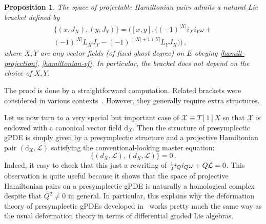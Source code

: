 \documentclass[a4paper,12pt]{article}
\numberwithin{equation}{section} %
\newtheorem{prop}[thm]{Proposition}
\newcommand{\dx}{\mathrm{d}_X}
\newcommand{\half}{\mathchoice{%
    \ffrac{1}{2}}{\frac{1}{2}}{\frac{1}{2}}{\frac{1}{2}}}
\newcommand{\ffrac}[2]{\raisebox{.5pt}%
  {\footnotesize$\displaystyle\frac{#1}{#2}$}\kern1pt}
\def\cL{\mathcal{L}}
\def\cX{\mathcal{X}}
\begin{document}
\begin{prop}\label{bracket-for-pairs-def}
    The space of projectable Hamiltonian pairs admits a natural Lie bracket defined by 
    \begin{multline} \label{bracket-for-pairs}
        \{(x,J_X), (y, J_Y)\} = 
        ([x,y], ((-1)^{|X|}i_Xi_Y\omega +\\ (-1)^{|X|}L_X J_Y - (-1)^{(|X|+1)|Y| }L_Y J_X))\,,
    \end{multline}
    where $X, Y$ are any vector fields (of fixed ghost degree) on $E$ obeying \eqref{hamilt-projection}, \eqref{hamiltonian-vf}. In particular,
    the bracket does not depend on the choice of $X,Y$. 
\end{prop}
The  proof is done by a straightforward computation. Related brackets were considered in various contexts~\cite{Deligne:1999qp,Fiorenza_2014,delgado2018lagrangianfieldtheoriesindproapproach,schiavina2025homotopieslagrangianfieldtheory}. However, they generally require extra structures.


Let us now turn to a very special but important case of $\cX\equiv T[1]X$ so that $\cX$ is endowed with a canonical vector field $\dx$. Then the structure of presymplectic gPDE is simply given by a presymplectic structure and a projective Hamiltonian pair $(\dx,\cL)$ satisfying the conventional-looking master equation:
\begin{equation}
        \{(d_X,\cL), (d_X,\cL) \} = 0\,.
\end{equation}
Indeed, it easy to check that this just a rewriting of $\half i_Qi_Q\omega+Q\cL=0$.
This observation is quite useful because it shows that the space of projective Hamiltonian pairs on a presymplectic gPDE is naturally a homological complex despite that $Q^2\neq 0$ in general. In particular, this explains why the deformation theory of presymplectic gPDEs developed in~\cite{Frias:2024vgw} works pretty much the same way as the usual deformation theory in terms of differential graded Lie algebras.
\end{document}
